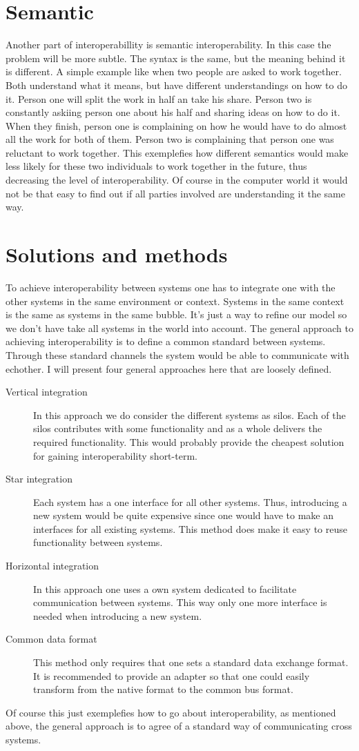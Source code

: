 \section{Semantic}
Another part of interoperabillity is semantic interoperability. In this case the problem will be more subtle.
The syntax is the same, but the meaning behind it is different. 
A simple example like when two people are asked to work together. Both understand what it means, but have different understandings on how to do it.
Person one will split the work in half an take his share. Person two is constantly askiing person one about his half and sharing ideas on how to do it.
When they finish, person one is complaining on how he would have to do almost all the work for both of them. Person two is complaining that person one was reluctant to work together. 
This exemplefies how different semantics would make less likely for these two individuals to work together in the future, thus decreasing the level of interoperability. Of course in the computer world it would not be that easy to find out if all parties involved are understanding it the same way.


\section{Solutions and methods}
To achieve interoperability between systems one has to integrate one with the other systems in the same environment or context.
Systems in the same context is the same as systems in the same bubble. It's just a way to refine our model so we don't have take all systems in the world into account. 
The general approach to achieving interoperability is to define a common standard between systems. Through these standard channels the system would be able to communicate with echother. 
I will present four general approaches here that are loosely defined\cite{16}. 
\begin{description}
\item[Vertical integration]In this approach we do consider the different systems as silos. 
Each of the silos contributes with some functionality and as a whole delivers the required functionality.
This would probably provide the cheapest solution for gaining interoperability short-term.
\item[Star integration]Each system has a one interface for all other systems. Thus, introducing a new system would be quite expensive since one would have to make an interfaces for all existing systems. This method does make it easy to reuse functionality between systems. 
\item[Horizontal integration]In this approach one uses a own system dedicated to facilitate communication between systems. This way only one more interface is needed when introducing a new system.
\item[Common data format]This method only requires that one sets a standard data exchange format. It is recommended to provide an adapter so that one could easily transform from the native format to the common bus format. 
\end{description}
Of course this just exemplefies how to go about interoperability, as mentioned above, the general approach is to agree of a standard way of communicating cross systems. 
